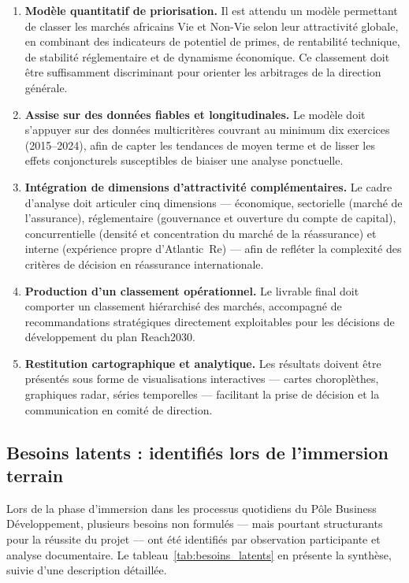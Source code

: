 \documentclass[../main.tex]{subfiles}
\begin{document}
\begin{enumerate}[leftmargin=1.5cm, itemsep=6pt, label=\textbf{BE.\arabic*}]
  \item \textbf{Modèle quantitatif de priorisation.} Il est attendu un modèle permettant de classer les marchés africains Vie et Non-Vie selon leur attractivité globale, en combinant des indicateurs de potentiel de primes, de rentabilité technique, de stabilité réglementaire et de dynamisme économique. Ce classement doit être suffisamment discriminant pour orienter les arbitrages de la direction générale.

  \item \textbf{Assise sur des données fiables et longitudinales.} Le modèle doit s'appuyer sur des données multicritères couvrant au minimum dix exercices (2015--2024), afin de capter les tendances de moyen terme et de lisser les effets conjoncturels susceptibles de biaiser une analyse ponctuelle.

  \item \textbf{Intégration de dimensions d'attractivité complémentaires.} Le cadre d'analyse doit articuler cinq dimensions --- économique, sectorielle (marché de l'assurance), réglementaire (gouvernance et ouverture du compte de capital), concurrentielle (densité et concentration du marché de la réassurance) et interne (expérience propre d'Atlantic~Re) --- afin de refléter la complexité des critères de décision en réassurance internationale.

  \item \textbf{Production d'un classement opérationnel.} Le livrable final doit comporter un classement hiérarchisé des marchés, accompagné de recommandations stratégiques directement exploitables pour les décisions de développement du plan Reach2030.

  \item \textbf{Restitution cartographique et analytique.} Les résultats doivent être présentés sous forme de visualisations interactives --- cartes choroplèthes, graphiques radar, séries temporelles --- facilitant la prise de décision et la communication en comité de direction.
\end{enumerate}

\subsection{Besoins latents : identifiés lors de l'immersion terrain}

Lors de la phase d'immersion dans les processus quotidiens du Pôle Business Développement, plusieurs besoins non formulés --- mais pourtant structurants pour la réussite du projet --- ont été identifiés par observation participante et analyse documentaire. Le tableau~\ref{tab:besoins_latents} en présente la synthèse, suivie d'une description détaillée.
\end{document}
